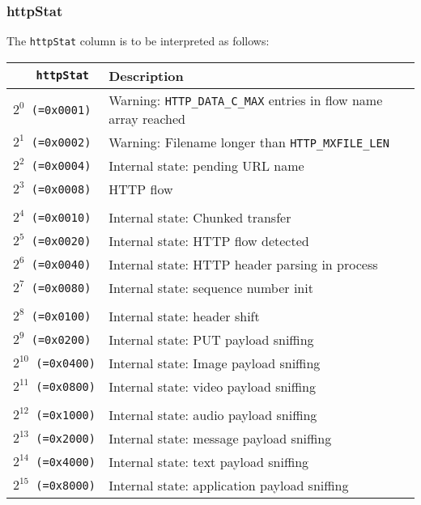 \documentclass[documentation]{subfiles}
\begin{document}
\subsubsection{httpStat}\label{httpStat}
The {\tt httpStat} column is to be interpreted as follows:
\begin{longtable}{>{\tt}rl}
    \toprule
    {\bf httpStat}     & {\bf Description}\\
    \midrule\endhead%
    $2^{0}$  (=0x0001) & Warning: {\tt HTTP\_DATA\_C\_MAX} entries in flow name array reached\\
    $2^{1}$  (=0x0002) & Warning: Filename longer than {\tt HTTP\_MXFILE\_LEN}\\
    $2^{2}$  (=0x0004) & Internal state: pending URL name\\
    $2^{3}$  (=0x0008) & HTTP flow\\
    \\
    $2^{4}$  (=0x0010) & Internal state: Chunked transfer\\
    $2^{5}$  (=0x0020) & Internal state: HTTP flow detected\\
    $2^{6}$  (=0x0040) & Internal state: HTTP header parsing in process\\
    $2^{7}$  (=0x0080) & Internal state: sequence number init\\
    \\
    $2^{8}$  (=0x0100) & Internal state: header shift\\
    $2^{9}$  (=0x0200) & Internal state: PUT payload sniffing\\
    $2^{10}$ (=0x0400) & Internal state: Image payload sniffing\\
    $2^{11}$ (=0x0800) & Internal state: video payload sniffing\\
    \\
    $2^{12}$ (=0x1000) & Internal state: audio payload sniffing\\
    $2^{13}$ (=0x2000) & Internal state: message payload sniffing\\
    $2^{14}$ (=0x4000) & Internal state: text payload sniffing\\
    $2^{15}$ (=0x8000) & Internal state: application payload sniffing\\
    \bottomrule
\end{longtable}
\end{document}

